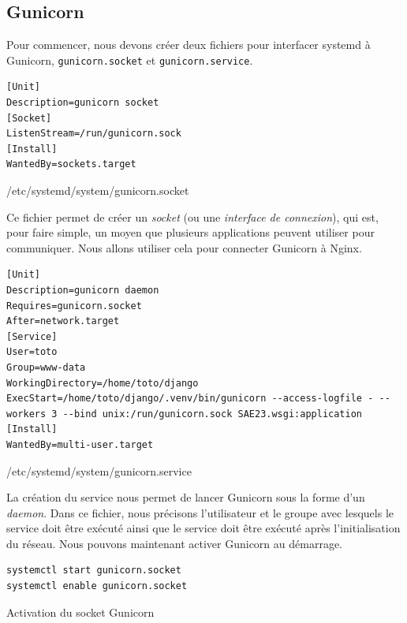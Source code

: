 \documentclass{article}
\begin{document}
    \newpage

        \subsection{Gunicorn}
        Pour commencer, nous devons créer deux fichiers pour interfacer systemd à Gunicorn, \verb|gunicorn.socket| et \verb|gunicorn.service|.
        \begin{listing}[H]
            \begin{verbatim}
[Unit]
Description=gunicorn socket
[Socket]
ListenStream=/run/gunicorn.sock
[Install]
WantedBy=sockets.target
            \end{verbatim}
            \caption{/etc/systemd/system/gunicorn.socket}
            \label{code:gunicorn.socket}
        \end{listing}
        Ce fichier permet de créer un \emph{socket} (ou une \emph{interface de connexion}), qui est, pour faire simple, un moyen que plusieurs applications peuvent utiliser pour communiquer.
        Nous allons utiliser cela pour connecter Gunicorn à Nginx.
        \begin{listing}[H]
            \begin{verbatim}
[Unit]
Description=gunicorn daemon
Requires=gunicorn.socket
After=network.target
[Service]
User=toto
Group=www-data
WorkingDirectory=/home/toto/django
ExecStart=/home/toto/django/.venv/bin/gunicorn --access-logfile - --workers 3 --bind unix:/run/gunicorn.sock SAE23.wsgi:application
[Install]
WantedBy=multi-user.target
            \end{verbatim}
            \caption{/etc/systemd/system/gunicorn.service}
            \label{code:gunicorn.service} 
        \end{listing}
        La création du service nous permet de lancer Gunicorn sous la forme d'un \emph{daemon}.
        Dans ce fichier, nous précisons l'utilisateur et le groupe avec lesquels le service doit être exécuté ainsi que le service doit être exécuté après l'initialisation du réseau.
        Nous pouvons maintenant activer Gunicorn au démarrage.
        \begin{listing}[H]
            \begin{verbatim}
systemctl start gunicorn.socket
systemctl enable gunicorn.socket
            \end{verbatim}
            \caption{Activation du socket Gunicorn}
            \label{code:enable-gunicorn} 
        \end{listing}
\end{document}
